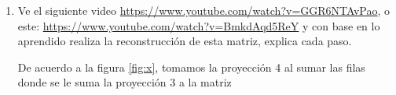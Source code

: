 \begin{enumerate}[1.]
\pagebreak





  \item  Ve el siguiente video \url{https://www.youtube.com/watch?v=GGR6NTAvPao}, o este: \url{https://www.youtube.com/watch?v=BmkdAqd5ReY} y con base en lo aprendido realiza la
  reconstrucción de esta matriz, explica cada paso.






De acuerdo a la figura \ref{fig:x}, tomamos la proyección 4 al sumar las filas
donde se le suma la proyección 3 a la matriz 



\end{enumerate}
